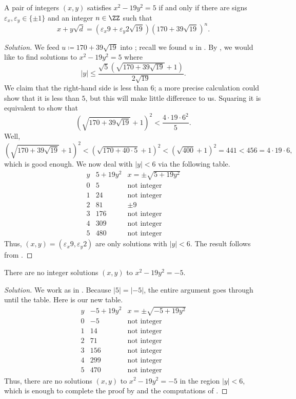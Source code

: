 \documentclass[../notes.tex]{subfiles}
\begin{document}
\begin{example} \label{ex:pell-19-norm-5}
	A pair of integers $(x,y)$ satisfies $x^2-19y^2=5$ if and only if there are signs $\varepsilon_x,\varepsilon_y\in\{\pm1\}$ and an integer $n\in\ZZ$ such that
	\[x+y\sqrt d=\left(\varepsilon_x9+\varepsilon_y2\sqrt{19}\right)\left(170+39\sqrt{19}\right)^n.\]
\end{example}
\begin{proof}[Solution]
	We feed $u\coloneqq170+39\sqrt{19}$ into ; recall we found $u$ in . By , we would like to find solutions to $x^2-19y^2=5$ where
	\[\left|y\right|\le\frac{\sqrt{5}\left(\sqrt{170+39\sqrt{19}}+1\right)}{2\sqrt{19}}.\]
	We claim that the right-hand side is less than $6$; a more precise calculation could show that it is less than $5$, but this will make little difference to us. Squaring it is equivalent to show that
	\[\left(\sqrt{170+39\sqrt{19}}+1\right)^2<\frac{4\cdot19\cdot6^2}5.\]
	Well,
	\[\left(\sqrt{170+39\sqrt{19}}+1\right)^2<\left(\sqrt{170+40\cdot5}+1\right)^2<\left(\sqrt{400}+1\right)^2=441<456=4\cdot19\cdot6,\]
	which is good enough. We now deal with $\left|y\right|<6$ via the following table.
	\[\begin{array}{c|c|c}
		y & 5+19y^2 & x=\pm\sqrt{5+19y^2} \\\hline
		0 &       5 & \text{not integer} \\
		1 &      24 & \text{not integer} \\
		2 &      81 & \pm9 \\
		3 &     176 & \text{not integer} \\
		4 &     309 & \text{not integer} \\
		5 &     480 & \text{not integer}
	\end{array}\]
	Thus, $(x,y)=(\varepsilon_x9,\varepsilon_y2)$ are only solutions with $\left|y\right|<6$. The result follows from .
\end{proof}
\begin{example}
	There are no integer solutions $(x,y)$ to $x^2-19y^2=-5$.
\end{example}
\begin{proof}[Solution]
	We work as in . Because $\left|5\right|=\left|-5\right|$, the entire argument goes through until the table. Here is our new table.
	\[\begin{array}{c|c|c}
		y & -5+19y^2 & x=\pm\sqrt{-5+19y^2} \\\hline
		0 &      -5 & \text{not integer} \\
		1 &      14 & \text{not integer} \\
		2 &      71 & \text{not integer} \\
		3 &     156 & \text{not integer} \\
		4 &     299 & \text{not integer} \\
		5 &     470 & \text{not integer}
	\end{array}\]
	Thus, there are no solutions $(x,y)$ to $x^2-19y^2=-5$ in the region $\left|y\right|<6$, which is enough to complete the proof by  and the computations of .
\end{proof}
\end{document}
